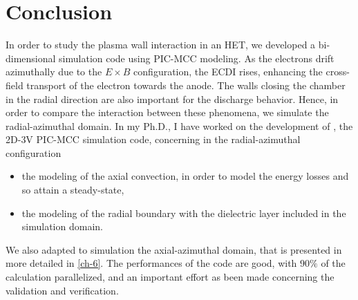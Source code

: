 


\section{Conclusion}
  \label{sec-conclusion_ch1}
  

  In order to study the plasma wall interaction in an \ac{HET}, we developed a bi-dimensional simulation code using \ac{PIC}-\ac{MCC} modeling.
  As the electrons drift azimuthally due to the $E \times B$ configuration, the \ac{ECDI} rises, enhancing the cross-field transport of the electron towards the anode.
  The walls closing the chamber in the radial direction are also important for the discharge behavior.
  Hence, in order to compare the interaction between these phenomena, we simulate the radial-azimuthal domain.
  In my Ph.D., I have worked on the development of  \LPPic, the \ac{2D}-\ac{3V} \ac{PIC}-\ac{MCC} simulation code, concerning in the radial-azimuthal configuration
  \begin{itemize}
    \item the modeling of the axial convection, in order to model the energy losses and so attain a steady-state,
    \item the modeling of the radial boundary with the dielectric layer included in the simulation domain.
  \end{itemize}
  
  We also adapted \LPPic to simulation the axial-azimuthal domain, that is presented in more detailed in \cref{ch-6}.
  The performances of the code are good, with $90\%$ of the calculation parallelized, and an important effort as been made concerning the validation and verification.